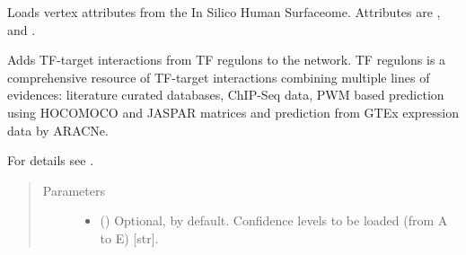 \documentclass[letterpaper,10pt,english]{sphinxmanual}
\begin{document}
\begin{fulllineitems}
\begin{fulllineitems}
\begin{quote}
\begin{description}
\begin{itemize}
\end{itemize}

\end{description}\end{quote}

\end{fulllineitems}


\begin{fulllineitems}
\label{\detokenize{reference:pypath.main.PyPath.load_signor_ptms}}
\end{fulllineitems}


\begin{fulllineitems}
\label{\detokenize{reference:pypath.main.PyPath.load_surfaceome_attrs}}
Loads vertex attributes from the In Silico Human Surfaceome.
Attributes are ,  and
.

\end{fulllineitems}


\begin{fulllineitems}
\label{\detokenize{reference:pypath.main.PyPath.load_tfregulons}}
Adds TF-target interactions from TF regulons to the network.
TF regulons is a comprehensive resource of TF-target
interactions combining multiple lines of evidences: literature
curated databases, ChIP-Seq data, PWM based prediction using
HOCOMOCO and JASPAR matrices and prediction from GTEx expression
data by ARACNe.

For details see .
\begin{quote}\begin{description}
\item[{Parameters}] \leavevmode\begin{itemize}
\item {} 
 () \textendash{} Optional,  by default. Confidence levels to be
loaded (from A to E) {[}str{]}.


\end{itemize}
\end{description}
\end{quote}
\end{fulllineitems}
\end{fulllineitems}
\end{document}
